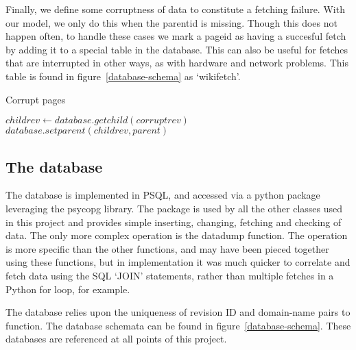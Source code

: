 Finally, we define some corruptness of data to constitute a fetching
failure. With our model, we only do this when the parentid is
missing. Though this does not happen often, to handle these cases we
mark a pageid as having a succesful fetch by adding it to a special
table in the database. This can also be useful for fetches that are
interrupted in other ways, as with hardware and network problems. This
table is found in figure~\ref{database-schema} as `wikifetch'. 

\begin{algorithm}
  \caption{Corrupt pages}\label{corrupt-clean}
  \begin{algorithmic}
    \State $childrev \gets database.getchild(corruptrev)$
    \State $database.setparent(childrev, parent)$ 
    \EndProcedure
  \end{algorithmic}
\end{algorithm}

\subsection*{The database}
The database is implemented in PSQL, and accessed via a python package
leveraging the psycopg library. The package is used by all the other
classes used in this project and provides simple inserting, changing,
fetching and checking of data. The only more complex operation is the
datadump function. The operation is more specific than the other
functions, and may have been pieced together using these functions,
but in implementation it was much quicker to correlate and fetch data
using the SQL `JOIN' statements, rather than multiple fetches in a
Python for loop, for example.

The database relies upon the uniqueness of revision ID and domain-name
pairs to function. The database schemata can be found in
figure~\ref{database-schema}. These databases are referenced at all
points of this project.

